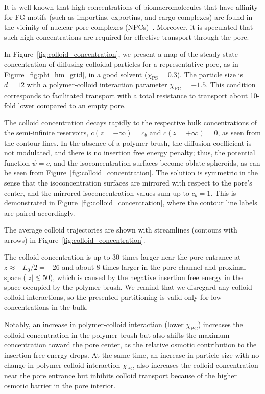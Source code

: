 \documentclass[12pt, a4paper]{article}
\newcommand\todo[1]{\textcolor{red}{#1}}
\begin{document}
It is well-known that high concentrations of biomacromolecules that have affinity for FG motifs (such as importins, exportins, and cargo complexes) are found in the vicinity of nuclear pore complexes (NPCs)~\cite{Beck2007, Gruenwald2010, Tu2011}.
Moreover, it is speculated that such high concentrations are required for effective transport through the pore.%

In Figure~\ref{fig:colloid_concentration}, we present a map of the steady-state concentration of diffusing colloidal particles for a representative pore, as in Figure~\ref{fig:phi_hm_grid}, in a good solvent ($\chi_{\text{PS}} = 0.3$).
The particle size is $d = 12$ with a polymer-colloid interaction parameter $\chi_{\text{PC}} = -1.5$.
This condition corresponds to facilitated transport with a total resistance to transport about 10-fold lower compared to an empty pore.

The colloid concentration decays rapidly to the respective bulk concentrations of the semi-infinite reservoirs, $c(z = -\infty) = c_{b}$ and $c(z = +\infty) = 0$, as seen from the contour lines.
In the absence of a polymer brush, the diffusion coefficient is not modulated, and there is no insertion free energy penalty; thus, the potential function $\psi = c$, and the isoconcentration surfaces become oblate spheroids, as can be seen from Figure~\ref{fig:colloid_concentration}.
The solution is symmetric in the sense that the isoconcentration surfaces are mirrored with respect to the pore's center, and the mirrored isoconcentration values sum up to $c_{b} = 1$.
This is demonstrated in Figure~\ref{fig:colloid_concentration}, where the contour line labels are paired accordingly.

The average colloid trajectories are shown with streamlines (contours with arrows) in Figure~\ref{fig:colloid_concentration}.

The colloid concentration is up to 30 times larger near the pore entrance at $z \approx -L_{0}/2 = -26$ and about 8 times larger in the pore channel and proximal space ($|z| \lesssim 50$), which is caused by the negative insertion free energy in the space occupied by the polymer brush.
We remind that we disregard any colloid-colloid interactions, so the presented partitioning is valid only for low concentrations in the bulk.

Notably, an increase in polymer-colloid interaction (lower $\chi_{\text{PC}}$) increases the colloid concentration in the polymer brush but also shifts the maximum concentration toward the pore center, as the relative osmotic contribution to the insertion free energy drops.
At the same time, an increase in particle size with no change in polymer-colloid interaction $\chi_{\text{PC}}$ also increases the colloid concentration near the pore entrance but inhibits colloid transport because of the higher osmotic barrier in the pore interior.
\end{document}
